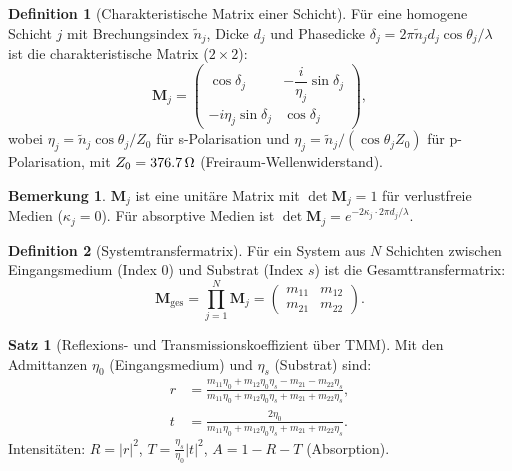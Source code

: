 ﻿\documentclass[a4paper,12pt]{article}
\theoremstyle{definition}
\newtheorem{definition}{Definition}[section]
\newtheorem{satz}{Satz}[section]
\newtheorem{bemerkung}{Bemerkung}[section]
\newcommand{\matr}[1]{\mathbf{#1}}
\begin{document}
	\begin{definition}[Charakteristische Matrix einer Schicht]
		\label{def:char-matrix}
		Für eine homogene Schicht $j$ mit Brechungsindex $\tilde{n}_j$,
		Dicke $d_j$ und Phasedicke $\delta_j = 2\pi\tilde{n}_j d_j \cos\theta_j/\lambda$
		ist die charakteristische Matrix ($2\times 2$):
		\begin{equation}
			\matr{M}_j = \begin{pmatrix}
				\cos\delta_j & -\dfrac{i}{\eta_j}\sin\delta_j \\[6pt]
				-i\eta_j\sin\delta_j & \cos\delta_j
			\end{pmatrix},
			\label{eq:char-matrix}
		\end{equation}
		wobei $\eta_j = \tilde{n}_j \cos\theta_j / Z_0$ für s-Polarisation
		und $\eta_j = \tilde{n}_j / (\cos\theta_j Z_0)$ für p-Polarisation,
		mit $Z_0 = \SI{376{,}7}{\ohm}$ (Freiraum-Wellenwiderstand).
	\end{definition}
	
	\begin{bemerkung}
		$\matr{M}_j$ ist eine unitäre Matrix mit $\det\matr{M}_j = 1$ für
		verlustfreie Medien ($\kappa_j = 0$). Für absorptive Medien ist
		$\det\matr{M}_j = e^{-2\kappa_j \cdot 2\pi d_j/\lambda}$.
	\end{bemerkung}
	
	\begin{definition}[Systemtransfermatrix]
		\label{def:system-matrix}
		Für ein System aus $N$ Schichten zwischen Eingangsmedium (Index 0)
		und Substrat (Index $s$) ist die Gesamttransfermatrix:
		\begin{equation}
			\matr{M}_\mathrm{ges} = \prod_{j=1}^{N} \matr{M}_j
			= \begin{pmatrix} m_{11} & m_{12} \\ m_{21} & m_{22} \end{pmatrix}.
			\label{eq:system-matrix}
		\end{equation}
	\end{definition}
	
	\begin{satz}[Reflexions- und Transmissionskoeffizient über TMM]
		\label{satz:tmm-rt}
		Mit den Admittanzen $\eta_0$ (Eingangsmedium) und $\eta_s$ (Substrat) sind:
		\begin{align}
			r &= \frac{m_{11}\eta_0 + m_{12}\eta_0\eta_s - m_{21} - m_{22}\eta_s}
			{m_{11}\eta_0 + m_{12}\eta_0\eta_s + m_{21} + m_{22}\eta_s},
			\label{eq:tmm-r}\\
			t &= \frac{2\eta_0}
			{m_{11}\eta_0 + m_{12}\eta_0\eta_s + m_{21} + m_{22}\eta_s}.
			\label{eq:tmm-t}
		\end{align}
		Intensitäten: $R = |r|^2$, $T = \frac{\eta_s}{\eta_0}|t|^2$,
		$A = 1 - R - T$ (Absorption).
	\end{satz}
	
\end{document}
